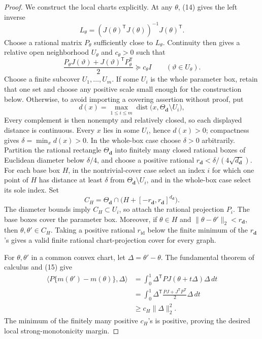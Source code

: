 \documentclass{article}
\begin{document}
\begin{proof}
We construct the local charts explicitly.  At any \(\theta\), (14) gives the left inverse
\[
 L_\theta=(J(\theta)^{\mathsf T}J(\theta))^{-1}J(\theta)^{\mathsf T}.
\]
Choose a rational matrix \(P_\theta\) sufficiently close to \(L_\theta\).  Continuity then gives a relative open neighborhood \(U_\theta\) and \(c_\theta>0\) such that
\[
 \frac{P_\theta J(\vartheta)+J(\vartheta)^{\mathsf T}P_\theta^{\mathsf T}}2
 \succeq c_\theta I
 \qquad(\vartheta\in U_\theta). \tag{15}
\]
Choose a finite subcover \(U_1,\ldots,U_m\).  If some \(U_i\) is the whole parameter box, retain that one set and choose any positive scale small enough for the construction below.  Otherwise, to avoid importing a covering assertion without proof, put
\[
 d(x)=\max_{1\leq i\leq m}
 \operatorname{dist}\bigl(x,\Theta_{\boldsymbol d}\setminus U_i\bigr),
\]
Every complement is then nonempty and relatively closed, so each displayed distance is continuous.  Every \(x\) lies in some \(U_i\), hence \(d(x)>0\); compactness gives \(\delta=\min_xd(x)>0\).  In the whole-box case choose \(\delta>0\) arbitrarily.  Partition the rational rectangle \(\Theta_{\boldsymbol d}\) into finitely many closed rational boxes of Euclidean diameter below \(\delta/4\), and choose a positive rational \(r_{\boldsymbol d}<\delta/(4\sqrt{d_{\boldsymbol d}})\).  For each base box \(H\), in the nontrivial-cover case select an index \(i\) for which one point of \(H\) has distance at least \(\delta\) from \(\Theta_{\boldsymbol d}\setminus U_i\), and in the whole-box case select its sole index.  Set
\[
 C_H=\Theta_{\boldsymbol d}\cap
 \bigl(H+[-r_{\boldsymbol d},r_{\boldsymbol d}]^{d_{\boldsymbol d}}\bigr).
\]
The diameter bounds imply \(C_H\subset U_i\), so attach the rational projection \(P_i\).  The base boxes cover the parameter box.  Moreover, if \(\theta\in H\) and \(\|\theta-\theta'\|_2<r_{\boldsymbol d}\), then \(\theta,\theta'\in C_H\).  Taking a positive rational \(r_{\mathrm{id}}\) below the finite minimum of the \(r_{\boldsymbol d}\)'s gives a valid finite rational chart-projection cover for every graph.

For \(\theta,\theta'\) in a common convex chart, let \(\Delta=\theta'-\theta\).  The fundamental theorem of calculus and (15) give
\[
\begin{aligned}
 \langle P\{m(\theta')-m(\theta)\},\Delta\rangle
 &=\int_0^1\Delta^{\mathsf T}PJ(\theta+t\Delta)\Delta\,dt\\
 &=\int_0^1\Delta^{\mathsf T}
 \frac{PJ+J^{\mathsf T}P^{\mathsf T}}2
 \Delta\,dt\\
 &\geq c_H\|\Delta\|_2^2.
\end{aligned} \tag{16}
\]
The minimum of the finitely many positive \(c_H\)'s is positive, proving the desired local strong-monotonicity margin.


\end{proof}
\end{document}

